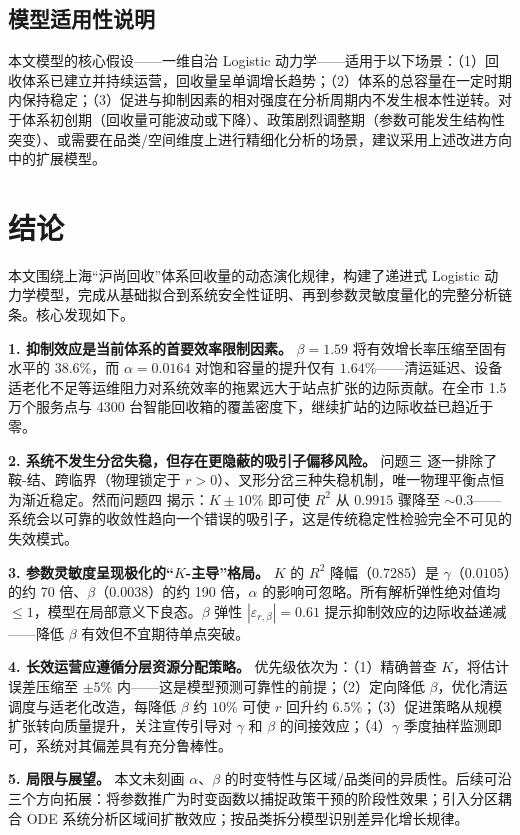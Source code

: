 \documentclass[12pt,a4paper]{ctexart}
\begin{document}
\subsection{模型适用性说明}

本文模型的核心假设——一维自治 Logistic 动力学——适用于以下场景：（1）回收体系已建立并持续运营，回收量呈单调增长趋势；（2）体系的总容量在一定时期内保持稳定；（3）促进与抑制因素的相对强度在分析周期内不发生根本性逆转。对于体系初创期（回收量可能波动或下降）、政策剧烈调整期（参数可能发生结构性突变）、或需要在品类/空间维度上进行精细化分析的场景，建议采用上述改进方向中的扩展模型。

\section{结论}

本文围绕上海``沪尚回收''体系回收量的动态演化规律，构建了递进式 Logistic 动力学模型，完成从基础拟合到系统安全性证明、再到参数灵敏度量化的完整分析链条。核心发现如下。

\textbf{1. 抑制效应是当前体系的首要效率限制因素。}
$\beta = 1.59$ 将有效增长率压缩至固有水平的 $38.6\%$，而 $\alpha = 0.0164$ 对饱和容量的提升仅有 $1.64\%$——清运延迟、设备适老化不足等运维阻力对系统效率的拖累远大于站点扩张的边际贡献。在全市 1.5 万个服务点与 4300 台智能回收箱的覆盖密度下，继续扩站的边际收益已趋近于零。

\textbf{2. 系统不发生分岔失稳，但存在更隐蔽的吸引子偏移风险。}
问题三 逐一排除了鞍-结、跨临界（物理锁定于 $r>0$）、叉形分岔三种失稳机制，唯一物理平衡点恒为渐近稳定。然而问题四 揭示：$K \pm 10\%$ 即可使 $R^2$ 从 $0.9915$ 骤降至 $\sim 0.3$——系统会以可靠的收敛性趋向一个错误的吸引子，这是传统稳定性检验完全不可见的失效模式。

\textbf{3. 参数灵敏度呈现极化的``$K$-主导''格局。}
$K$ 的 $R^2$ 降幅（$0.7285$）是 $\gamma$（$0.0105$）的约 70 倍、$\beta$（$0.0038$）的约 190 倍，$\alpha$ 的影响可忽略。所有解析弹性绝对值均 $\leq 1$，模型在局部意义下良态。$\beta$ 弹性 $|\varepsilon_{r,\beta}| = 0.61$ 提示抑制效应的边际收益递减——降低 $\beta$ 有效但不宜期待单点突破。

\textbf{4. 长效运营应遵循分层资源分配策略。}
优先级依次为：（1）精确普查 $K$，将估计误差压缩至 $\pm 5\%$ 内——这是模型预测可靠性的前提；（2）定向降低 $\beta$，优化清运调度与适老化改造，每降低 $\beta$ 约 $10\%$ 可使 $r$ 回升约 $6.5\%$；（3）促进策略从规模扩张转向质量提升，关注宣传引导对 $\gamma$ 和 $\beta$ 的间接效应；（4）$\gamma$ 季度抽样监测即可，系统对其偏差具有充分鲁棒性。

\textbf{5. 局限与展望。}
本文未刻画 $\alpha$、$\beta$ 的时变特性与区域/品类间的异质性。后续可沿三个方向拓展：将参数推广为时变函数以捕捉政策干预的阶段性效果；引入分区耦合 ODE 系统分析区域间扩散效应；按品类拆分模型识别差异化增长规律。
\end{document}
